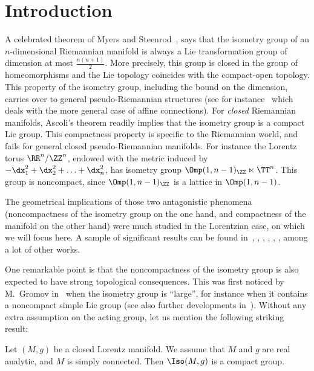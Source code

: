 \section{Introduction} 
A celebrated theorem of Myers and Steenrod~\cite{myers-steenrod}, says that the isometry group of an $n$-dimensional Riemannian manifold is always a Lie transformation group of dimension at most $\frac{n(n+1)}{2}$. More precisely, this group is closed in the group of homeomorphisms and the Lie topology coincides with the compact-open topology. This property of the isometry group, including the bound on the dimension, carries over to general pseudo-Riemannian structures (see for instance~\cite{nomizu2} which deals with the more general case of affine connections). For \emph{closed} Riemannian manifolds, Ascoli's theorem readily implies that the isometry group is a compact Lie group. This compactness property is specific to the Riemannian world, and fails for general closed pseudo-Riemannian manifolds. For instance the Lorentz torus $ \RR^n /\ZZ^n$, endowed with the metric induced by $-\dx_1^2+\dx_2^2+\ldots+\dx_n^2$, has isometry group $\Omp(1,n-1)_{\ZZ}\ltimes\TT^n$. This group is noncompact, since $\Omp(1,n-1)_{\ZZ}$ is a lattice in $\Omp(1,n-1)$.

The geometrical implications of those two antagonistic phenomena (noncompact\-ness of the isometry group on the one hand, and compactness of the manifold on the other hand) were much studied in the Lorentzian case, on which we will focus here. A sample of significant results can be found in~\cite{adams.stuck}, \cite{gromov}, \cite{zeghib.isom}, \cite{zeghibisom1}, \cite{zeghibisom2}, \cite{zimmer.iso}, among a lot of other works.

One remarkable point is that the noncompactness of the isometry group is also expected to have strong topological consequences. This was first noticed by M.~Gromov in~\cite{gromov} when the isometry group is ``large'', for instance when it contains a noncompact simple Lie group (see also further developments in~\cite{fisher.zimmer}). Without any extra assumption on the acting group, let us mention the following striking result:



\begin{theo}\label{thm.dambra}
Let $(M,g)$ be a closed Lorentz manifold. We assume that $M$ and $g$ are real analytic, and $M$ is simply connected. Then $\Iso(M,g)$ is a compact group.
\end{theo}

